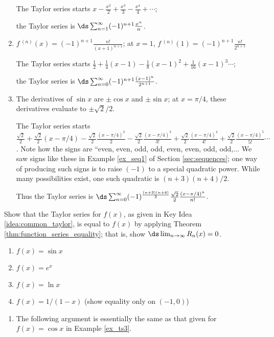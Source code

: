 \begin{enumialphparenastyle}
\begin{ex}
\begin{sol}
\begin{enumerate}
{The Taylor series starts $x-\frac{x^2}2+\frac{x^3}3-\frac{x^4}4+\cdots$; 

the Taylor series is $\ds \sum_{n=1}^\infty (-1)^{n+1}\frac{x^n}{n}$.
}
\item
{$f\,^{(n)}(x) = (-1)^{n+1}\frac{n!}{(x+1)^{n+1}}$; at $x=1$, $f\,^{(n)}(1)=(-1)^{n+1}\frac{n!}{2^{n+1}}$

The Taylor series starts $\frac12+\frac14(x-1)-\frac18(x-1)^2+\frac1{16}(x-1)^3\cdots$; 

the Taylor series is $\ds \sum_{n=0}^\infty (-1)^{n+1}\frac{(x-1)^n}{2^{n+1}}$.
}
\item 
{The derivatives of $\sin x$ are $\pm \cos x$ and $\pm \sin x$; at $x=\pi/4$, these derivatives evaluate to $\pm \sqrt{2}/2$. 

The Taylor series starts $\frac{\sqrt{2}}2+\frac{\sqrt{2}}2(x-\pi/4) - \frac{\sqrt{2}}2\frac{(x-\pi/4)^2}{2}-\frac{\sqrt{2}}2\frac{(x-\pi/4)^3}{3!}+\frac{\sqrt{2}}2\frac{(x-\pi/4)^4}{4!}+\frac{\sqrt{2}}2\frac{(x-\pi/4)^5}{5!}\cdots$. Note how the signs are ``even, even, odd, odd, even, even, odd, odd,$\ldots$ We saw signs like these in Example \ref{ex_seq1} of Section \ref{sec:sequences}; one way of producing such signs is to raise $(-1)$ to a special quadratic power. While many possibilities exist, 
one such quadratic is $(n+3)(n+4)/2$. 

Thus the Taylor series is $\ds \sum_{n=0}^\infty (-1)^{\frac{(n+3)(n+4)}{2}}\frac{\sqrt2}{2}\frac{(x-\pi/4)^n}{n!}$.
}
\end{enumerate}
\end{sol}

\end{ex}
\begin{ex}
Show that the Taylor series for $f(x)$, as given in Key Idea \ref{idea:common_taylor}, is equal to $f(x)$ by applying Theorem \ref{thm:function_series_equality}; that is, show $\ds \lim_{n\to\infty}R_n(x) =0$.
\begin{enumerate}
\item {$f(x) = \sin x$
}
\item {$f(x) = e^x$
}
\item {$f(x) = \ln x$
}
\item {$f(x) = 1/(1-x)$ (show equality only on $(-1,0)$)
}
\end{enumerate}

\begin{sol}
\begin{enumerate}
\item 
{The following argument is essentially the same as that given for $f(x) = \cos x$ in Example \ref{ex_ts3}.

}
\end{enumerate}
\end{sol}
\end{ex}
\end{enumialphparenastyle}
